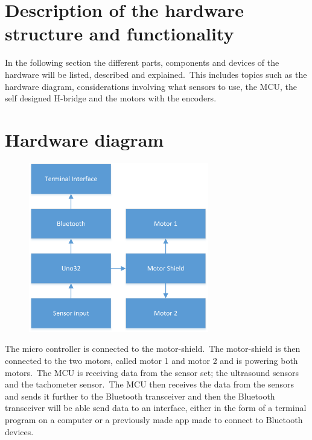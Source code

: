 \section{Description of the hardware structure and functionality}
In the following section the different parts, components and devices of the hardware will be listed, described and explained.\
This includes topics such as the hardware diagram, considerations involving what sensors to use, the MCU, the self designed H-bridge and the motors with the encoders.

\section{Hardware diagram}
\begin{figure}[!ht]
	\centering
	\includegraphics[width=0.7\textwidth]{figures/UdklipDIA2.png}
	\caption{}
	\label{Hardware diagram}
\end{figure}

The micro controller is connected to the motor-shield.\ The motor-shield is then connected to the two motors, called motor 1 and motor 2 and is powering both motors.\ The MCU is receiving data from the sensor set; the ultrasound sensors and the tachometer sensor.\ The MCU then receives the data from the sensors and sends it further to the Bluetooth transceiver and then the Bluetooth transceiver will be able send data to an interface, either in the form of a terminal program on a computer or a previously made app made to connect to Bluetooth devices. \\ \\

